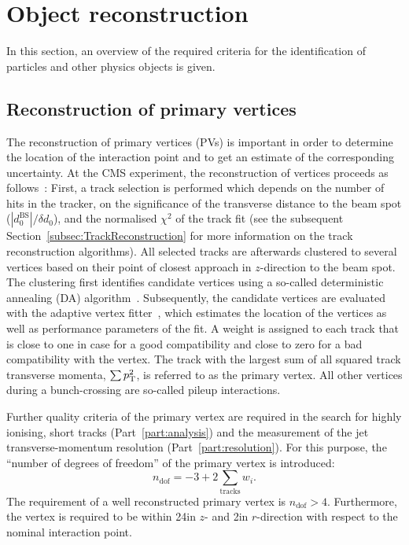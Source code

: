 \section{Object reconstruction}
\label{sec:ObjectReconstruction}
In this section, an overview of the required criteria for the identification of particles and other physics objects is given.

\subsection{Reconstruction of primary vertices} 
\label{sec:VertexReconstruction}
The reconstruction of primary vertices (PVs) is important in order to determine the location of the interaction point and to get an estimate of the corresponding uncertainty.
At the CMS experiment, the reconstruction of vertices proceeds as follows~\cite{bib:CMS:tracking_8TeV}:
First, a track selection is performed which depends on the number of hits in the tracker, on the significance of the transverse distance to the beam spot ($|d_0^{\text{BS}}|/\delta d_0$), and the normalised $\chi^2$ of the track fit (see the subsequent Section~\ref{subsec:TrackReconstruction} for more information on the track reconstruction algorithms).
All selected tracks are afterwards clustered to several vertices based on their point of closest approach in $z$-direction to the beam spot.
The clustering first identifies candidate vertices using a so-called deterministic annealing (DA) algorithm~\cite{bib:VertexReconstruction_DA}.
Subsequently, the candidate vertices are evaluated with the adaptive vertex fitter~\cite{bib:VertexReconstruction_AVF}, which estimates the location of the vertices as well as performance parameters of the fit.
A weight is assigned to each track that is close to one in case for a good compatibility and close to zero for a bad compatibility with the vertex.
The track with the largest sum of all squared track transverse momenta, $\sum p_{\text{T}}^2$, is referred to as the primary vertex. 
All other vertices during a bunch-crossing are so-called pileup interactions.

Further quality criteria of the primary vertex are required in the search for highly ionising, short tracks (Part~\ref{part:analysis}) and the measurement of the jet transverse-momentum resolution (Part~\ref{part:resolution}).
For this purpose, the ``number of degrees of freedom'' of the primary vertex is introduced: 
\begin{equation}
n_{\text{dof}} = -3 + 2 \sum_{\text{tracks}} w_i.
\end{equation}
The requirement of a well reconstructed primary vertex is  $n_{\text{dof}}>4$.
Furthermore, the vertex is required to be within 24\cm in $z$- and 2\cm in $r$-direction with respect to the nominal interaction point.


